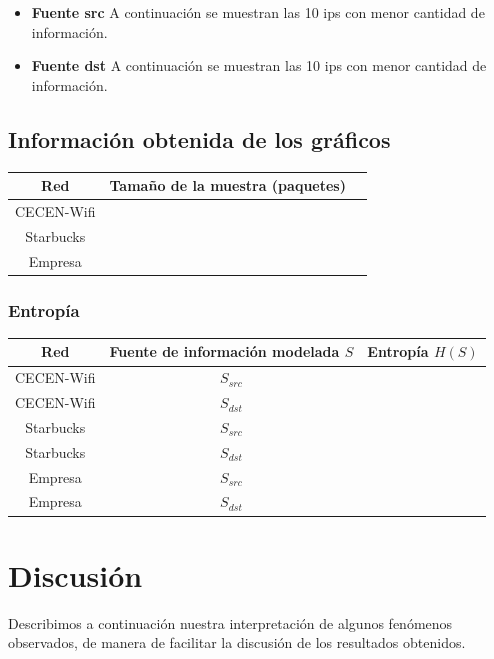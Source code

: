 \documentclass[10pt, a4paper]{article}
\begin{document}
\begin{itemize}
\item \textbf{Fuente src}
A continuaci\'on se muestran las 10 ips con menor cantidad de informaci\'on.

%
\vspace{2cm}

\item \textbf{Fuente dst}
A continuaci\'on se muestran las 10 ips con menor cantidad de informaci\'on.

%
\vspace{2cm}
\end{itemize}


\subsection{Información obtenida de los gráficos}

\begin{center}
\begin{tabular}{|c|c|c|}
\hline
Red & Tamaño de la muestra (paquetes)\\
\hline
CECEN-Wifi & \\
Starbucks   &   \\
Empresa    &   \\
\hline
\end{tabular}
\end{center}


\subsubsection{Entropía}

\begin{center}
\begin{tabular}{|c|c|c|}
\hline
Red & Fuente de información modelada $S$ & Entropía $H(S)$\\
\hline
CECEN-Wifi & $S_{src}$ & \\
CECEN-Wifi & $S_{dst}$ & \\
\hline
Starbucks   & $S_{src}$ & \\
Starbucks   & $S_{dst}$ & \\
\hline
Empresa    & $S_{src}$ & \\
Empresa    & $S_{dst}$ & \\
\hline
\end{tabular}
\end{center}

\section{Discusión}
Describimos a continuación nuestra interpretación de algunos fenómenos observados, de manera de facilitar la discusión de los resultados obtenidos.
\end{document}
